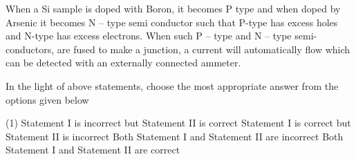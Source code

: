 \item When a Si sample is doped with Boron, it becomes P type and when doped by Arsenic it becomes N – type semi conductor such that P-type has excess holes and N-type has excess electrons. When such P – type and N – type semi-conductors, are fused to make a junction, a current will automatically flow which can be detected with an externally connected ammeter.

In the light of above statements, choose the most appropriate answer from the options given below
    \begin{tasks}(1)
        \task Statement I is incorrect but Statement II is correct
        \task Statement I is correct but Statement II is incorrect
        \task Both Statement I and Statement II are incorrect
        \task Both Statement I and Statement II are correct
    \end{tasks}